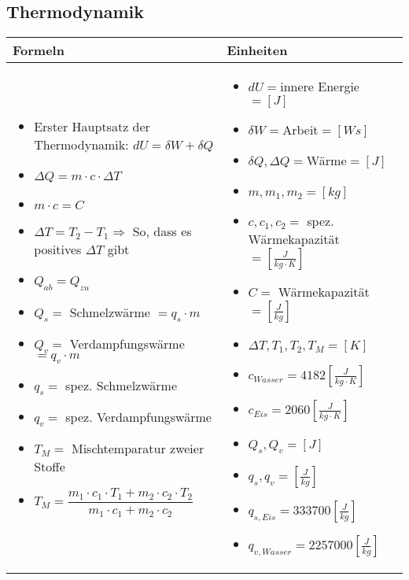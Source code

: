 \subsection{Thermodynamik}				%
	\begin{tabular}{ | m{10cm} | m{8cm}  | }
		\hline
		Formeln & Einheiten \\ \hline
		\hline
		\begin{itemize}
			\item Erster Hauptsatz der Thermodynamik: $dU=\delta W+\delta Q$ 	
			\item $\Delta Q=m\cdot c\cdot \Delta T$
			\item $m\cdot c=C$
			\item $\Delta T=T_{2}-T_{1}\Rightarrow$ {\color{red} So, dass es positives $\Delta T$ gibt}
			\item $Q_{ab}=Q_{zu}$
			\item $Q_{s}=$ Schmelzwärme $= q_{s}\cdot m$ 	
			\item $Q_{v}=$ Verdampfungswärme $= q_{v}\cdot m$
			\item $q_{s}=$ spez. Schmelzwärme
			\item $q_{v}=$ spez. Verdampfungswärme 	
			\item $T_{M}=$ Mischtemparatur zweier Stoffe
			\item $T_{M}=\dfrac{m_{1}\cdot c_{1}\cdot T_{1}+m_{2}\cdot c_{2}\cdot T_{2}}{m_{1}\cdot c_{1}+m_{2}\cdot c_{2}}$
		\end{itemize}
		&
		\begin{itemize}
			\item $dU=$innere Energie$=[J]$
			\item $\delta W=$Arbeit$=[Ws]$
			\item $\delta Q,\Delta Q=$Wärme$=[J]$
			\item $m,m_{1},m_{2}=[kg]$
			\item $c,c_{1},c_{2}=$ spez. Wärmekapazität $=[\frac{J}{kg\cdot K}]$
			\item $C=$ Wärmekapazität $=[\frac{J}{kg}]$
			\item $\Delta T,T_{1},T_{2},T_{M}=[K]$
			\item $c_{Wasser}=4182[\frac{J}{kg\cdot K}]$
			\item $c_{Eis}=2060[\frac{J}{kg\cdot K}]$
			\item $Q_{s},Q_{v}=[J]$
			\item $q_{s},q_{v}=[\frac{J}{kg}]$
			\item $q_{s,Eis}=333700[\frac{J}{kg}]$
			\item $q_{v,Wasser}=2257000[\frac{J}{kg}]$
		\end{itemize}
		\\ \hline
	\end{tabular}

